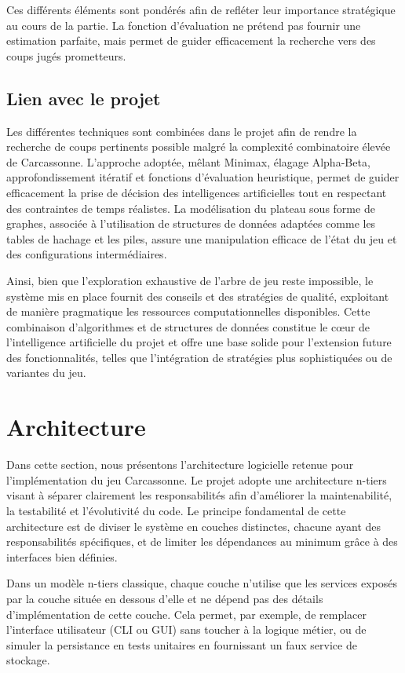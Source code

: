\documentclass[11pt]{article}
\begin{document}
Ces différents éléments sont pondérés afin de refléter leur importance stratégique au cours de la partie.
La fonction d’évaluation ne prétend pas fournir une estimation parfaite, mais permet de guider efficacement la recherche vers des coups jugés prometteurs.

\subsection{Lien avec le projet}

Les différentes techniques sont combinées dans le projet afin de rendre la recherche de coups pertinents possible malgré la complexité combinatoire élevée de Carcassonne. 
L’approche adoptée, mêlant Minimax, élagage Alpha-Beta, approfondissement itératif et fonctions d’évaluation heuristique, permet de guider efficacement la prise de décision des intelligences artificielles tout en respectant des contraintes de temps réalistes.
La modélisation du plateau sous forme de graphes, associée à l’utilisation de structures de données adaptées comme les tables de hachage et les piles, assure une manipulation efficace de l’état du jeu et des configurations intermédiaires.

Ainsi, bien que l’exploration exhaustive de l’arbre de jeu reste impossible, le système mis en place fournit des conseils et des stratégies de qualité, exploitant de manière pragmatique les ressources computationnelles disponibles. 
Cette combinaison d’algorithmes et de structures de données constitue le cœur de l’intelligence artificielle du projet et offre une base solide pour l’extension future des fonctionnalités, telles que l’intégration de stratégies plus sophistiquées ou de variantes du jeu.



\section{Architecture}
Dans cette section, nous présentons l’architecture logicielle retenue pour l’implémentation du jeu Carcassonne.
Le projet adopte une architecture n-tiers\cite{n_tier_architecture} visant à séparer clairement les responsabilités afin d’améliorer la maintenabilité, la testabilité et l’évolutivité du code.
Le principe fondamental de cette architecture est de diviser le système en couches distinctes, chacune ayant des responsabilités spécifiques, et de limiter les dépendances au minimum grâce à des interfaces bien définies.

Dans un modèle n-tiers classique, chaque couche n’utilise que les services exposés par la couche située en dessous d’elle et ne dépend pas des détails d’implémentation de cette couche. Cela permet, par exemple, de remplacer l’interface utilisateur (CLI ou GUI) sans toucher à la logique métier, ou de simuler la persistance en tests unitaires en fournissant un faux service de stockage.
\end{document}
